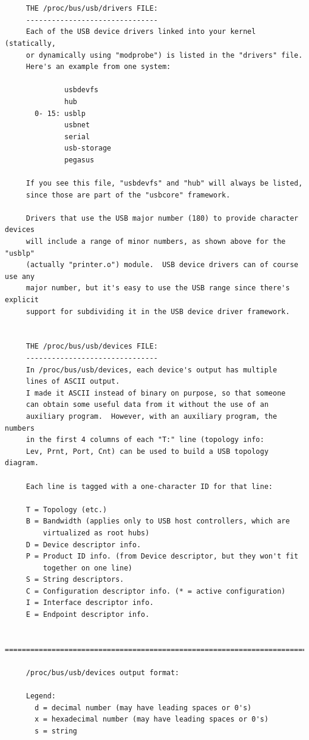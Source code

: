 {{{{{{{{{{{{{{{{{\begin{verbatim}
     
     
     THE /proc/bus/usb/drivers FILE:
     -------------------------------
     Each of the USB device drivers linked into your kernel (statically,
     or dynamically using "modprobe") is listed in the "drivers" file.
     Here's an example from one system:
     
              usbdevfs
              hub
       0- 15: usblp
              usbnet
              serial
              usb-storage
              pegasus
     
     If you see this file, "usbdevfs" and "hub" will always be listed,
     since those are part of the "usbcore" framework.
     
     Drivers that use the USB major number (180) to provide character devices
     will include a range of minor numbers, as shown above for the "usblp"
     (actually "printer.o") module.  USB device drivers can of course use any
     major number, but it's easy to use the USB range since there's explicit
     support for subdividing it in the USB device driver framework.
     
     
     THE /proc/bus/usb/devices FILE:
     -------------------------------
     In /proc/bus/usb/devices, each device's output has multiple
     lines of ASCII output.
     I made it ASCII instead of binary on purpose, so that someone
     can obtain some useful data from it without the use of an
     auxiliary program.  However, with an auxiliary program, the numbers
     in the first 4 columns of each "T:" line (topology info:
     Lev, Prnt, Port, Cnt) can be used to build a USB topology diagram.
     
     Each line is tagged with a one-character ID for that line:
     
     T = Topology (etc.)
     B = Bandwidth (applies only to USB host controllers, which are
         virtualized as root hubs)
     D = Device descriptor info.
     P = Product ID info. (from Device descriptor, but they won't fit
         together on one line)
     S = String descriptors.
     C = Configuration descriptor info. (* = active configuration)
     I = Interface descriptor info.
     E = Endpoint descriptor info.
     
     =======================================================================
     
     /proc/bus/usb/devices output format:
     
     Legend:
       d = decimal number (may have leading spaces or 0's)
       x = hexadecimal number (may have leading spaces or 0's)
       s = string
     

\end{verbatim}}}}}}}}}}}}}}}}}}
